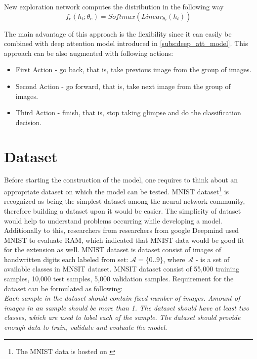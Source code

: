 {New exploration network computes the distribution in the following way
\begin{equation}
	f_e(h_t; \theta_e) = Softmax(Linear_{\theta_e}(h_t))
\end{equation}

The main advantage of this approach is the flexibility since it can easily be combined
with deep attention model introduced in \autoref{subs:deep_att_model}. This
approach can be also augmented with following actions:
\begin{itemize}
	\item First Action - go back, that is, take previous image from the group of images.
	\item Second Action - go forward, that is, take next image from the group of images.
	\item Third Action - finish, that is, stop taking glimpse and do the classification decision.
\end{itemize}


\section{Dataset}
\label{sec:analysis_dataset}

Before starting the construction of the model, one requires to think about an appropriate
dataset on which the model can be tested.
MNIST dataset\footnote{The MNIST data is hosted on \cite{LeCun2010}} is recognized as being the simplest dataset among the neural network
community, therefore building a dataset upon it would be easier. The simplicity of dataset
would help to understand problems occurring while developing a model.
Additionally to this, researchers from researchers from google
Deepmind used MNIST to evaluate RAM, which indicated that MNIST data would
be good fit for the extension as well. \cite{DBLP:journals/corr/MnihHGK14}
MNIST dataset is dataset consist of images of handwritten digits each labeled
from set: $\mathcal{A} = \{0 .. 9\}$, where $\mathcal{A}$ - is a set of available
classes in MNSIT dataset.
MNSIT dataset consist of 55,000 training samples, 10,000 test samples, 5,000 validation samples.
Requirement for the dataset can be formulated as following:\\
\textit{Each sample in the dataset should contain fixed number of images. Amount of images
in an sample should be more than 1. The dataset should have at least two classes,
which are used to label each of the sample. The dataset should provide enough
data to train, validate and evaluate the model.}



}
